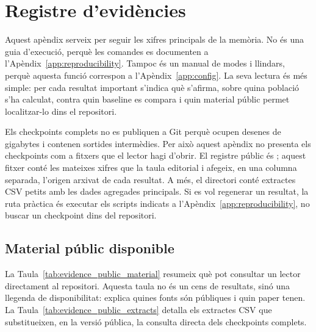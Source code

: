 \chapter{Registre d'evidències}
\label{app:evidence}

Aquest apèndix serveix per seguir les xifres principals de la memòria. No és
una guia d'execució, perquè les comandes es documenten a
l'Apèndix~\ref{app:reproducibility}. Tampoc és un manual de modes i llindars,
perquè aquesta funció correspon a l'Apèndix~\ref{app:config}. La seva lectura
és més simple: per cada resultat important s'indica què s'afirma, sobre quina
població s'ha calculat, contra quin baseline es compara i quin material públic
permet localitzar-lo dins el repositori.

Els checkpoints complets no es publiquen a Git perquè ocupen desenes de
gigabytes i contenen sortides intermèdies. Per això aquest apèndix no presenta
els checkpoints com a fitxers que el lector hagi d'obrir. El registre públic és
; aquest fitxer conté les mateixes
xifres que la taula editorial i afegeix, en una columna separada, l'origen
arxivat de cada resultat. A més, el directori
 conté extractes CSV petits amb les dades
agregades principals. Si es vol regenerar un resultat, la ruta pràctica és
executar els scripts indicats a l'Apèndix~\ref{app:reproducibility}, no buscar
un checkpoint dins del repositori.

\section{Material públic disponible}

La Taula~\ref{tab:evidence_public_material} resumeix què pot consultar un
lector directament al repositori. Aquesta taula no és un cens de resultats, sinó
una llegenda de disponibilitat: explica quines fonts són públiques i quin paper
tenen. La Taula~\ref{tab:evidence_public_extracts} detalla els extractes CSV
que substitueixen, en la versió pública, la consulta directa dels checkpoints
complets.

